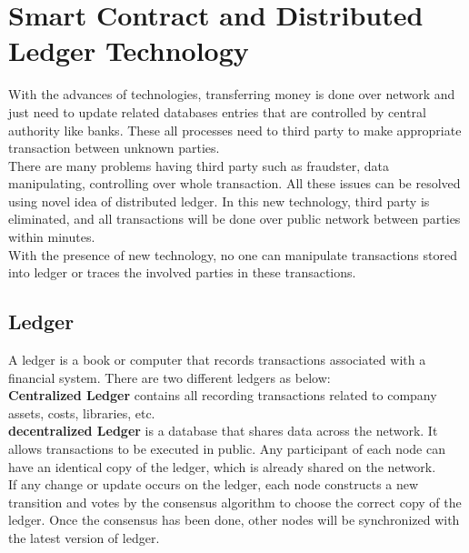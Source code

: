 \chapter{Smart Contract and Distributed Ledger Technology}
With the advances of technologies, transferring money is done over network and just need to update related databases entries that are controlled by central authority like banks. These all processes need to third party to make appropriate transaction between unknown parties. \\
There are many problems having third party such as fraudster, data manipulating, controlling over whole transaction. All these issues can be resolved using novel idea of distributed ledger. In this new technology, third party is eliminated, and all transactions will be done over public network between parties within minutes. \\
With the presence of new technology, no one can manipulate transactions stored into ledger or traces the involved parties in these transactions\cite{Masood}. 
\section{Ledger} 
A ledger is a book or computer that records transactions associated with a financial system. There are two different ledgers as below: \\
\textbf{Centralized Ledger} contains all recording transactions related to company assets, costs, libraries, etc. \\
\textbf{decentralized Ledger } is a database that shares data across the network. It allows transactions to be executed in public. Any participant of each node can have an identical copy of the ledger, which is already shared on the network.\\
If any change or update occurs on the ledger, each node constructs a new transition and votes by the consensus algorithm to choose the correct copy of the ledger. Once the consensus has been done, other nodes will be synchronized with the latest version of ledger\cite{Markos}.

